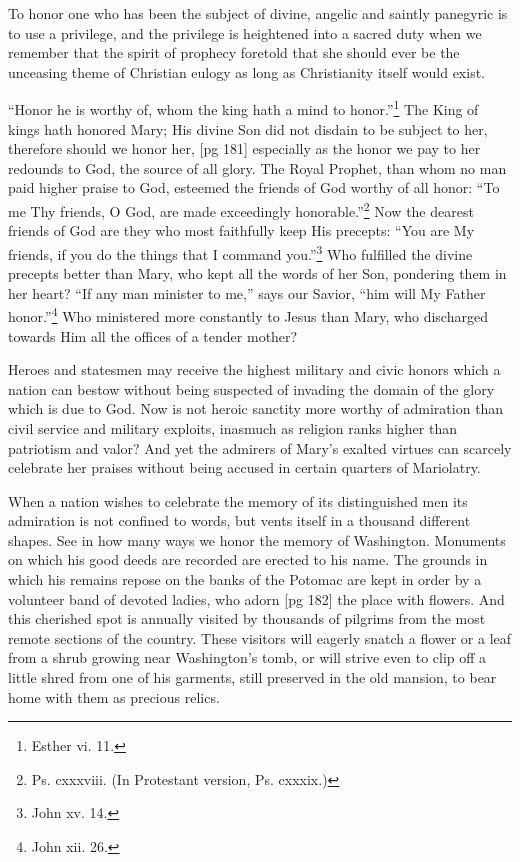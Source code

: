 To honor one who has been the subject of divine,
angelic and saintly panegyric is to use a privilege,
and the privilege is heightened into a sacred duty
when we remember that the spirit of prophecy
foretold that she should ever be the unceasing
theme of Christian eulogy as long as Christianity
itself would exist.

“Honor he is worthy of, whom the king hath a
mind to honor.”\footnote{Esther
vi. 11.} The King of kings hath honored
Mary; His divine Son did not disdain to be
subject to her, therefore should we honor her,
[pg 181]
especially as the honor we pay to her redounds
to God, the source of all glory. The Royal
Prophet, than whom no man paid higher praise
to God, esteemed the friends of God worthy of
all honor: “To me Thy friends, O God, are
made exceedingly honorable.”\footnote{Ps.
cxxxviii. (In Protestant version, Ps. cxxxix.)} Now the dearest
friends of God are they who most faithfully keep
His precepts: “You are My friends, if you do
the things that I command you.”\footnote{John
xv. 14.} Who fulfilled
the divine precepts better than Mary, who kept
all the words of her Son, pondering them in her
heart? “If any man minister to me,” says our
Savior, “him will My Father honor.”\footnote{John
xii. 26.} Who ministered
more constantly to Jesus than Mary, who
discharged towards Him all the offices of a tender
mother?

Heroes and statesmen may receive the highest
military and civic honors which a nation can bestow
without being suspected of invading the domain
of the glory which is due to God. Now is
not heroic sanctity more worthy of admiration
than civil service and military exploits, inasmuch
as religion ranks higher than patriotism and
valor? And yet the admirers of Mary's exalted
virtues can scarcely celebrate her praises without
being accused in certain quarters of Mariolatry.

When a nation wishes to celebrate the memory
of its distinguished men its admiration is not
confined to words, but vents itself in a thousand
different shapes. See in how many ways we honor
the memory of Washington. Monuments on which
his good deeds are recorded are erected to his
name. The grounds in which his remains repose
on the banks of the Potomac are kept in order by
a volunteer band of devoted ladies, who adorn
[pg 182]
the place with flowers. And this cherished spot
is annually visited by thousands of pilgrims from
the most remote sections of the country. These
visitors will eagerly snatch a flower or a leaf
from a shrub growing near Washington's tomb,
or will strive even to clip off a little shred from
one of his garments, still preserved in the old
mansion, to bear home with them as precious
relics.


